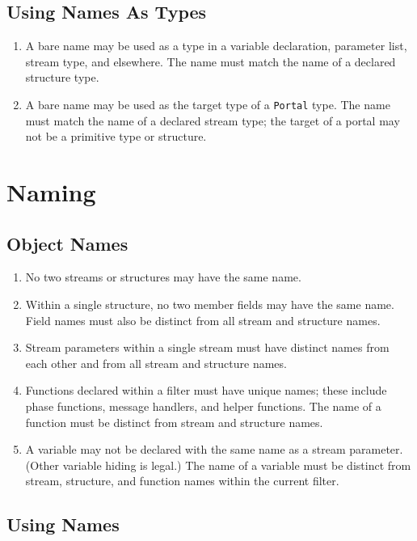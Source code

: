 \documentclass[11pt]{article}
\begin{document}
\subsection{Using Names As Types}

\begin{enumerate}
\item A bare name may be used as a type in a variable declaration,
  parameter list, stream type, and elsewhere.  The name must match the
  name of a declared structure type.
\item A bare name may be used as the target type of a
  \lstinline|Portal| type.  The name must match the name of a declared
  stream type; the target of a portal may not be a primitive type or
  structure.
\end{enumerate}

\section{Naming}

\subsection{Object Names}

\begin{enumerate}
\item No two streams or structures may have the same name.
\item Within a single structure, no two member fields may have the
  same name.  Field names must also be distinct from all stream and
  structure names.
\item Stream parameters within a single stream must have distinct
  names from each other and from all stream and structure names.
\item Functions declared within a filter must have unique names; these
  include phase functions, message handlers, and helper functions.
  The name of a function must be distinct from stream and structure
  names.
\item A variable may not be declared with the same name as a stream
  parameter.  (Other variable hiding is legal.)  The name of a
  variable must be distinct from stream, structure, and function
  names within the current filter.
\end{enumerate}

\subsection{Using Names}
\end{document}
